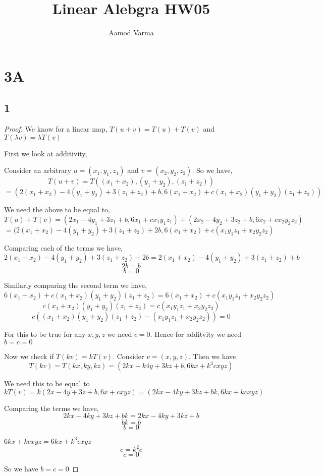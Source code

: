 \documentclass[a4paper]{report}
\title{Linear Alebgra HW05}
\author{Aamod Varma}
\begin{document}
\maketitle
\date{}


\section*{3A}

\subsection*{1}

\begin{proof}
    
We know for a linear map, $T(u + v) = T(u) + T(v)$ and $T(\lambda v ) = \lambda T(v)$

First we look at additivity, 

Consider an arbitrary  $u = (x_1,y_1,z_1)$ and $v = (x_2,y_2,z_2)$. So we have, 
$$ T(u + v) = T((x_1+x_2),(y_1+y_2),(z_1+z_2))$$ $$ = (2(x_1+x_2) - 4(y_1+y_2) + 3(z_1+z_2) + b, 6(x_1+x_2) + c(x_1+x_2)(y_1+y_2)(z_1+z_2)) $$ 


We need the above to be equal to, 
$$ T(u) + T(v) = (2x_1-4y_1+3z_1 + b, 6x_1 + cx_1y_1z_1) + (2x_2-4y_2+3z_2 + b, 6x_2 + cx_2y_2z_2) $$ 
$$ = (2(x_1+x_2) - 4(y_1+y_2) + 3(z_1+z_2) + 2b, 6(x_1+x_2) + c(x_1y_1z_1+x_2y_2z_2)$$ 

Comparing each of the terms we have, 
$$ 2(x_1+x_2) - 4(y_1+y_2) + 3(z_1+z_2)  + 2b  =  2(x_1+x_2) - 4(y_1+y_2) + 3(z_1+z_2) + b$$ 
$$ 2b = b $$ 
$$ b = 0 $$ 

Similarly comparing the second term we have, 
$$ 6(x_1+x_2) + c(x_1+x_2)(y_1+y_2)(z_1+z_2) =  6(x_1+x_2) + c(x_1y_1z_1+x_2y_2z_2) $$ 
$$ c(x_1+x_2)(y_1+y_2)(z_1+z_2) = c(x_1y_1z_1+x_2y_2z_2) $$ 
$$ c((x_1+x_2)(y_1+y_2)(z_1+z_2) - (x_1y_1z_1+x_2y_2z_2)) = 0 $$ 

For this to be true for any $x,y,z$ we need  $c = 0$. Hence for additvity we need $b = c = 0$

Now we check if $T(k v) = k T(v)$. Consider $v = (x,y,z)$. Then we have 
$$ T(k v) = T(k x,k y,k z) = (2kx - k4y + 3kz + b, 6kx + k^{3}cxyz) $$ 

We need this to be equal to $$kT(v) = k(2x - 4y + 3z + b, 6x + cxyz) = (2kx- 4ky + 3kz + bk, 6kx + kcxyz) $$

Comparing the terms we have, 
$$ 2kx - 4ky + 3kz + bk  = 2kx - 4ky + 3kz + b$$ 
$$ bk = b $$ 
$$b = 0$$

$6kx + kcxyz = 6kx+ k^{3}cxyz$ 
$$ c = k^2 c$$ 
$$ c = 0 $$ 

So we have $b = c = 0$

\end{proof}
\end{document}
